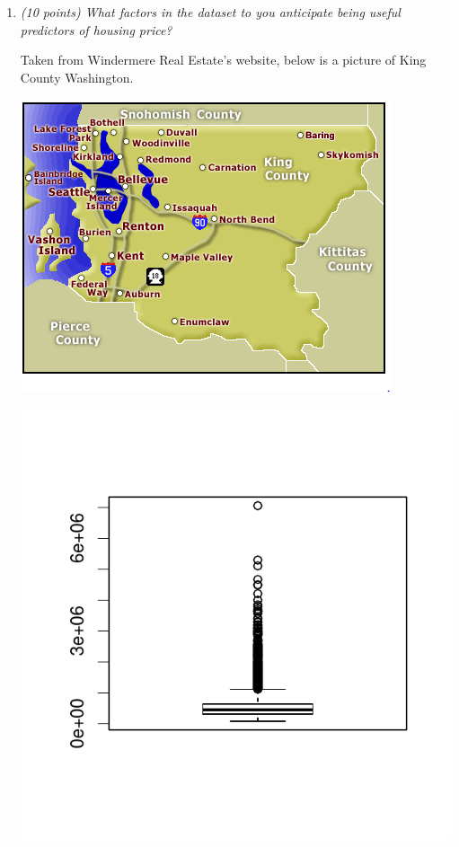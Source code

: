 \documentclass{article}\usepackage[]{graphicx}\usepackage[]{color}
\makeatletter
\def\maxwidth{ %
  \ifdim\Gin@nat@width>\linewidth
    \linewidth
  \else
    \Gin@nat@width
  \fi
}
\newenvironment{knitrout}{}{} %
\makeatother
\begin{document}
\begin{enumerate}
\begin{enumerate}
\item {\it (10 points) What factors in the dataset to you anticipate being useful predictors of housing
price?}

Taken from Windermere Real Estate's website, below is a picture of King County Washington.

\begin{center}
\includegraphics[scale = 0.75]{king_county}
\end{center}


\begin{knitrout}
\color{fgcolor}
\includegraphics[width=\maxwidth]{figure/prob3a-1} 


\end{knitrout}
\end{enumerate}
\end{enumerate}
\end{document}
